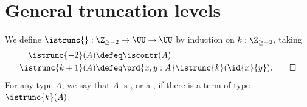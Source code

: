 \begin{comment}
\begin{thm}[Hedberg]\label{thm:dec_eq}
Any type with decidable equality is a set.
\end{thm}

\begin{proof}
Let $A$ be a type, and let $d:\prd{x,y:A}(\id{x}{y})+\neg(\id{x}{y})$ be the witness that $A$ has decidable equality.
We first construct a reflexive binary relation $E:A\to A\to\type$ such that each $E(x,y)$ is a proposition.
For every $x,y:A$, we first define a type family $E'(x,y):((\id{x}{y})+\neg(\id{x}{y}))\to\type$ by
\begin{align*}
E'(x,y,\inl(p)) & \defeq \unit \\
E'(x,y,\inr(p)) & \defeq \emptyt.
\end{align*}
Note that $E'(x,y,q)$ is a proposition for each $x,y:A$ and $q:(\id{x}{y})+\neg(\id{x}{y})$. 
Now we set $E(x,y)\defeq E'(x,y,d(x,y))$. Then $E$ is clearly reflexive, and a family of propositions.
Therefore it remains to show that $E$ implies identity. 

Since $E$ is defined as an instance of $E'$, it suffices to construct a term of type
\begin{equation*}
\prd{x,y:A}{q:(\id{x}{y})+\neg(\id{x}{y})} E'(q)\to (\id{x}{y}). 
\end{equation*}
By induction of disjoint sums, it suffices to construct terms of types
\begin{align*}
& \prd{x,y:A}{p:\id{x}{y}} \unit\to (\id{x}{y}) \\
& \prd{x,y:A}{p:\neg(\id{x}{y})} \emptyt\to (\id{x}{y}).
\end{align*}
In the first case, we take $\lam{x}{y}{p}{t}p$, and the second case is by induction on the empty type.
\end{proof}
\end{comment}

\section{General truncation levels}
\begin{defn}
We define $\istrunc{} : \Z_{\geq-2}\to\UU\to\UU$ by induction on $k:\Z_{\geq -2}$, taking
\begin{align*}
\istrunc{-2}(A) & \defeq \iscontr(A) \\
\istrunc{k+1}(A) & \defeq \prd{x,y:A}\istrunc{k}(\id{x}{y}).\qedhere
\end{align*}
For any type $A$, we say that $A$ is , or a , if there is a term of type $\istrunc{k}(A)$.
\end{defn}

